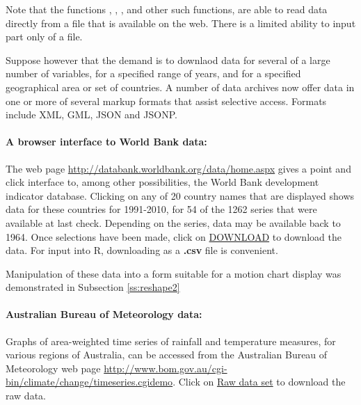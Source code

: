 Note that the functions , ,
, and other such functions, are able to read data
directly from a file that is available on the web.  There is a
limited ability to input part only of a file.

Suppose however that the demand is to downlaod data for several of a
large number of variables, for a specified range of years, and for a
specified geographical area or set of countries.    A number of data
archives now offer data in one or more of several markup formats that
assist selective access. Formats include XML, GML, JSON and JSONP.

\paragraph{A browser interface to World Bank data:}
The web page
\url{http://databank.worldbank.org/data/home.aspx} gives a point and click
interface to, among other possibilities, the World Bank development
indicator database.  Clicking on any of 20 country names that are
displayed shows data for these countries for 1991-2010, for 54 of the
1262 series that were available at last check.  Depending on the
series, data may be available back to 1964.  Once selections have been
made, click on \underline{DOWNLOAD} to download the data.  For input
into R, downloading as a {\bf .csv} file is convenient.

Manipulation of these data into a form suitable for a motion
chart display was demonstrated in Subsection \ref{ss:reshape2}

\paragraph{Australian Bureau of Meteorology data:}
Graphs of area-weighted time series of rainfall and temperature
measures, for various regions of Australia, can be accessed from the
Australian Bureau of Meteorology web page
\url{http://www.bom.gov.au/cgi-bin/climate/change/timeseries.cgidemo}.
Click on \underline{Raw data set} to download the raw data.


